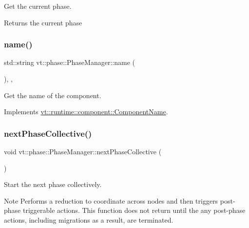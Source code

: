 Get the current phase. 

\begin{DoxyReturn}{Returns}
the current phase 
\end{DoxyReturn}
\mbox{\label{structvt_1_1phase_1_1_phase_manager_a159d95eca1eedeef33f245a3c232037d}} 
\subsubsection{\texorpdfstring{name()}{name()}}
{\footnotesize\ttfamily std\+::string vt\+::phase\+::\+Phase\+Manager\+::name (\begin{DoxyParamCaption}{ }\end{DoxyParamCaption})\hspace{0.3cm}{\ttfamily [inline]}, {\ttfamily [override]}, {\ttfamily [virtual]}}



Get the name of the component. 



Implements \hyperlink{structvt_1_1runtime_1_1component_1_1_component_name_a33c06229bb605a2b2ceff68830d6d773}{vt\+::runtime\+::component\+::\+Component\+Name}.

\mbox{\label{structvt_1_1phase_1_1_phase_manager_ac94bfde4a103cbdec426542191c41092}} 
\subsubsection{\texorpdfstring{next\+Phase\+Collective()}{nextPhaseCollective()}}
{\footnotesize\ttfamily void vt\+::phase\+::\+Phase\+Manager\+::next\+Phase\+Collective (\begin{DoxyParamCaption}{ }\end{DoxyParamCaption})}



Start the next phase collectively. 

\begin{DoxyNote}{Note}
Performs a reduction to coordinate across nodes and then triggers post-\/phase triggerable actions. This function does not return until the any post-\/phase actions, including migrations as a result, are terminated. 
\end{DoxyNote}
\mbox{\label{structvt_1_1phase_1_1_phase_manager_a59345a6496fb1413de1a1899fe4532cf}} 
